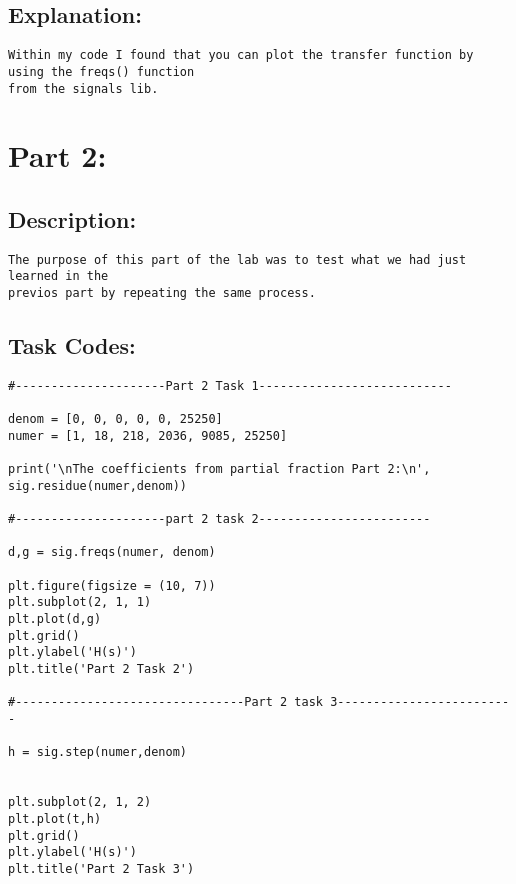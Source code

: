 \documentclass{article}
\begin{document}
\subsection{Explanation:}

\begin{verbatim}
Within my code I found that you can plot the transfer function by using the freqs() function 
from the signals lib. 
\end{verbatim}

\maketitle

\section{Part 2:}

\subsection{Description:}

\begin{verbatim}
The purpose of this part of the lab was to test what we had just learned in the 
previos part by repeating the same process. 
\end{verbatim}

\subsection{Task Codes:}

\begin{verbatim}
#---------------------Part 2 Task 1---------------------------

denom = [0, 0, 0, 0, 0, 25250]
numer = [1, 18, 218, 2036, 9085, 25250]

print('\nThe coefficients from partial fraction Part 2:\n', sig.residue(numer,denom))

#---------------------part 2 task 2------------------------

d,g = sig.freqs(numer, denom)

plt.figure(figsize = (10, 7))
plt.subplot(2, 1, 1)
plt.plot(d,g)
plt.grid()
plt.ylabel('H(s)')
plt.title('Part 2 Task 2')

#--------------------------------Part 2 task 3-------------------------

h = sig.step(numer,denom)


plt.subplot(2, 1, 2)
plt.plot(t,h)
plt.grid()
plt.ylabel('H(s)')
plt.title('Part 2 Task 3')

\end{verbatim}
\end{document}
